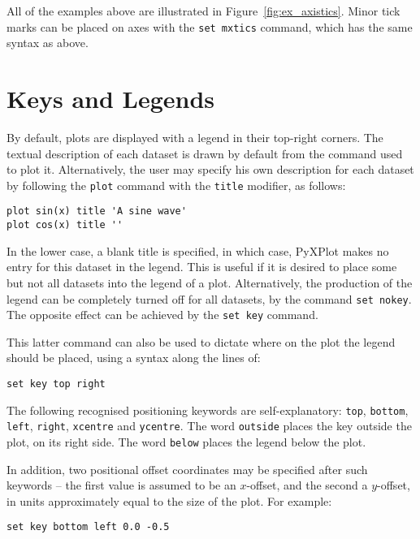 All of the examples above are illustrated in Figure~\ref{fig:ex_axistics}.
Minor tick marks can be placed on axes with the \texttt{set mxtics} command,
which has the same syntax as above.

\section{Keys and Legends}

By default, plots are displayed with a legend in their top-right corners. The
textual description of each dataset is drawn by default from the command used
to plot it. Alternatively, the user may specify his own description for each
dataset by following the \texttt{plot} command with the \texttt{title}
modifier, as follows:

\begin{verbatim}
plot sin(x) title 'A sine wave'
plot cos(x) title ''
\end{verbatim}

In the lower case, a blank title is specified, in which case, PyXPlot makes no
entry for this dataset in the legend. This is useful if it is desired to place
some but not all datasets into the legend of a plot.  Alternatively, the
production of the legend can be completely turned off for all datasets, by the
command \texttt{set nokey}. The opposite effect can be achieved by the
\texttt{set key} command.

This latter command can also be used to dictate where on the plot the legend
should be placed, using a syntax along the lines of:

\begin{verbatim}
set key top right
\end{verbatim}

The following recognised positioning keywords are self-explanatory:
\texttt{top}, \texttt{bottom}, \texttt{left}, \texttt{right}, \texttt{xcentre}
and \texttt{ycentre}. The word \texttt{outside} places the key outside the
plot, on its right side. The word \texttt{below} places the legend below the
plot.

In addition, two positional offset coordinates may be specified after such
keywords -- the first value is assumed to be an $x$-offset, and the second a
$y$-offset, in units approximately equal to the size of the plot. For example:

\begin{verbatim}
set key bottom left 0.0 -0.5
\end{verbatim}

